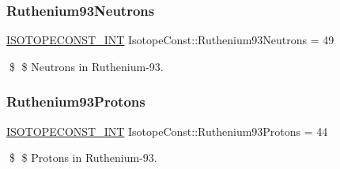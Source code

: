 \subsubsection{\texorpdfstring{Ruthenium93\+Neutrons}{Ruthenium93Neutrons}}
{\footnotesize\ttfamily \mbox{\hyperlink{group___isotope_const-_macros_ga5f18360b3e99483a35c32d789e62621c}{I\+S\+O\+T\+O\+P\+E\+C\+O\+N\+S\+T\+\_\+\+I\+NT}} Isotope\+Const\+::\+Ruthenium93\+Neutrons = 49}

\$ \$ Neutrons in Ruthenium-\/93. \mbox{\label{group___isotope_const-_ruthenium-_ru93_ga9608c576a1ce87410a02303cdeaca4ac}} 
\subsubsection{\texorpdfstring{Ruthenium93\+Protons}{Ruthenium93Protons}}
{\footnotesize\ttfamily \mbox{\hyperlink{group___isotope_const-_macros_ga5f18360b3e99483a35c32d789e62621c}{I\+S\+O\+T\+O\+P\+E\+C\+O\+N\+S\+T\+\_\+\+I\+NT}} Isotope\+Const\+::\+Ruthenium93\+Protons = 44}

\$ \$ Protons in Ruthenium-\/93. 